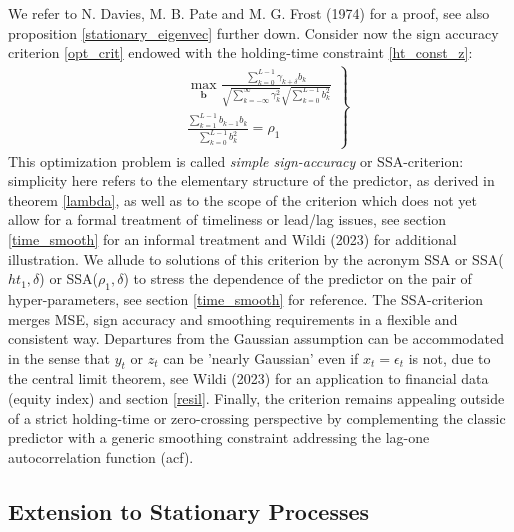 \documentclass[a4paper]{article}
\begin{document}
We refer to  N. Davies, M. B. Pate and M. G. Frost (1974) for a proof, see also proposition \ref{stationary_eigenvec} further down. 
Consider now the sign accuracy criterion  \ref{opt_crit} endowed with the holding-time constraint \ref{ht_const_z}:
\begin{eqnarray}\label{crit1}
\left.\begin{array}{cc}
&\max_{\mathbf{b}}\displaystyle{\frac{\sum_{k=0}^{L-1}\gamma_{k+\delta}b_{k}}{\sqrt{\sum_{k=-\infty}^\infty \gamma_k^2}\sqrt{\sum_{k=0}^{L-1}b_k^2}}}\\
&\displaystyle{\frac{\sum_{k=1}^{L-1}b_{k-1}b_{k}}{\sum_{k=0}^{L-1}b_k^2}=\rho_1}
\end{array}\right\}
\end{eqnarray}
This optimization problem is called \emph{simple sign-accuracy} or SSA-criterion: simplicity here refers to the elementary structure of the predictor, as derived in theorem \ref{lambda}, as well as to the scope of the criterion which does not yet allow for a formal treatment of timeliness or lead/lag issues, see section \ref{time_smooth} for an informal treatment and Wildi (2023) for additional illustration. We allude  to solutions of this criterion by the acronym SSA or SSA($ht_1,\delta$) or SSA($\rho_1,\delta$) to stress the dependence of the predictor on the pair of hyper-parameters, see section \ref{time_smooth} for reference. The SSA-criterion merges MSE, sign accuracy and smoothing requirements in a flexible and consistent way. Departures from the Gaussian assumption can be accommodated in the sense that $y_t$ or $z_t$ can be 'nearly Gaussian' even if $x_t=\epsilon_t$ is not, due to the central limit theorem, see Wildi (2023) for an application to financial data (equity index) and section \ref{resil}. Finally, the  criterion remains appealing outside of a strict holding-time or zero-crossing perspective by complementing the classic predictor with a generic smoothing constraint addressing the lag-one autocorrelation function (acf).        


\subsection{Extension to Stationary Processes}\label{ext_stat}
\end{document}

